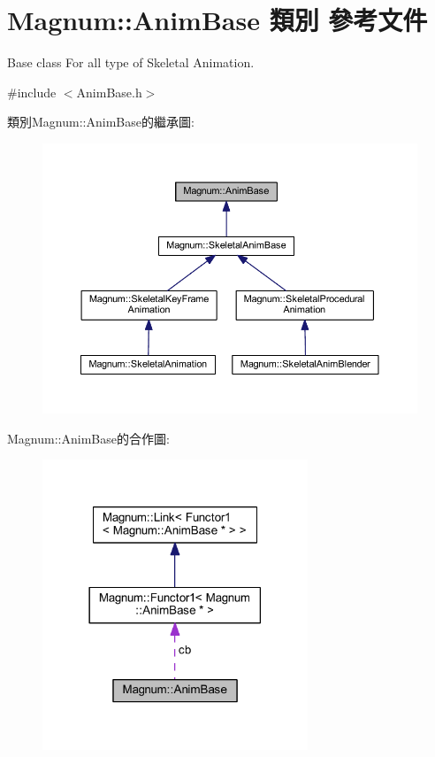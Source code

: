 \hypertarget{class_magnum_1_1_anim_base}{}\section{Magnum\+:\+:Anim\+Base 類別 參考文件}
\label{class_magnum_1_1_anim_base}


Base class For all type of Skeletal Animation.  




{\ttfamily \#include $<$Anim\+Base.\+h$>$}



類別\+Magnum\+:\+:Anim\+Base的繼承圖\+:\nopagebreak
\begin{figure}[H]
\begin{center}
\leavevmode
\includegraphics[width=350pt]{class_magnum_1_1_anim_base__inherit__graph}
\end{center}
\end{figure}


Magnum\+:\+:Anim\+Base的合作圖\+:\nopagebreak
\begin{figure}[H]
\begin{center}
\leavevmode
\includegraphics[width=225pt]{class_magnum_1_1_anim_base__coll__graph}
\end{center}
\end{figure}
